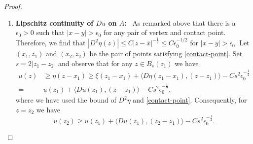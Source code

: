 \documentclass{amsart}
\theoremstyle{plain}
\numberwithin{equation}{section}
\begin{document}
\begin{proof}
\begin{enumerate}
\[T:A\longrightarrow V~~~~\text{by}~~~~T(z)=\bar x.\]
With this notation, \eqref{tref} can be rewritten as $Du(z)=D\eta\bigl(z-T(z)\bigr)~~\text{for}~~z\in A.$
In order to calculate the second derivative of $\eta$ we need  $z\not=T(z).$ In fact, it is easy to see that there exits a universal constant $\varepsilon_{0}>0$ depending on modulus of continuity and $M$ such that
\[|z-T(z)|\ge\varepsilon_{0}.\]
Indeed, suppose by contradiction that for each positive $\epsilon,$  $|z-T(z)|\leq\varepsilon.$ Then we have 
\[\omega(|z-T(z)|)\geq u(T(z))-u(z)\geq M-\left(1+\frac{5}{\sqrt2}\right)=\mu,\]
where $\omega$ is a modulus of continuity of $u.$ So if we choose $\epsilon_{0}$ sufficiently small such that $\omega(\epsilon_{0})<\mu/2$ then we get a contradiction to the fact that $\mu\geq\mu/2$ provided $|T(z)-z|\leq\epsilon_{0}.$ Thus the claim follows.\\
In view of above observation and the choice of $\eta$ we have 
\[\frac{15}{2\sqrt2}I\leq D^{2}\eta(z-T(z))\leq15\varepsilon_{0}^{-1/2}I.\]
Thus every eigenvalues of $D^{2}\eta(z-T(z))$ bounded below and we have
\begin{equation*}\label{inverse-bound}
\left|\left(D^{2}\eta(z-T(z))\right)^{-1}\right|\leq\frac{1}{c}.
\end{equation*}
\item{}\textbf{Lipschitz continuity of $Du$ on $A$:}~ As remarked above that there is a $\epsilon_{0}>0$ such that 
$|x-y|>\epsilon_0$ for any pair of vertex and contact point. Therefore, we find that $|D^{2}\eta(z)|\leq C|z-\bar{x}|^{-\frac{1}{2}}\leq C\epsilon_{0}^{-1/2}$ for $|x-y|>\epsilon_{0}.$ Let $(x_{1},z_{1})$ and $(x_{2},z_{2})$ be the pair of points satisfying \eqref{contact-point}. Set $s=2|z_{1}-z_{2}|$ and observe that for any $z\in B_{s}(z_{1})$ we have 
\begin{equation}\label{fil1}
\begin{aligned}
u(z)&\geq \eta(z-x_{1})\geq \xi(z_{1}-x_{1})+\langle D\eta(z_{1}-x_{1}),(z-z_{1})\rangle-Cs^{2}\epsilon_{0}^{-\frac{1}{2}}\\
=& u(z_{1})+\langle Du(z_{1}),(z-z_{1})\rangle-Cs^{2}\epsilon_{0}^{-\frac{1}{2}},
\end{aligned}
\end{equation}
where we have used the bound of $D^{2}\eta$ and \eqref{contact-point}. Consequently, for $z=z_{2}$ we have 
\begin{equation*}
u(z_{2})\geq u(z_{1})+\langle Du(z_{1}),(z_{2}-z_{1}) \rangle-Cs^{2}\epsilon_{0}^{-\frac{1}{2}}.
\end{equation*}

\end{enumerate}
\end{proof}
\end{document}
